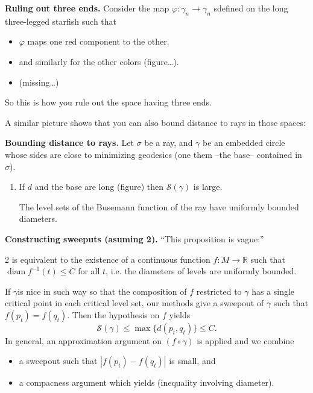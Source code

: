 \medskip\noindent
{\bf Ruling out three ends.}
Consider the map $\varphi:\gamma_n \to
\gamma_n$ sdefined on the long three-legged
starfish such that
\begin{itemize}
\item $\varphi$ maps one red component to
the other.
\item and similarly for the other colors
(figure…).
\item (missing…)
\end{itemize}

\noindent
So this is how you rule out the space having
three ends.

A similar picture shows that you can also
bound distance to rays in those spaces:

\medskip\noindent
{\bf Bounding distance to rays.}
Let $\sigma$ be a ray, and $\gamma$ be an
embedded circle whose sides are close to
minimizing geodesics (one them --the base--
contained in $\sigma$).

\begin{enumerate}
\item If $d$ and the base are long (figure)
then $\mathcal{S}(\gamma)$ is large.

The level sets of the Busemann function of
the ray have uniformly bounded diameters.
\end{enumerate}

\medskip\noindent
{\bf Constructing sweeputs (asuming 2).}
``This proposition is vague:''

\begin{proposition}
\label{proposition-2-equiv}
2 is equivalent to the existence of a
continuous function $f:M \to \mathbb{R}$
such that $\operatorname{diam}f^{-1}(t) \leq  C$ for all
$t$, i.e. the diameters of levels are
uniformly bounded.
\end{proposition}

\noindent
If $\gamma $is nice in such way so that the
composition of $f$ restricted to $\gamma$
has a single critical point in each critical
level set, our methods give a sweepout
of $\gamma$ such that $f(p_t)=f(q_t)$.
Then the hypothesis on $f$ yields
$$
\mathcal{S}(\gamma)\leq 
\operatorname{max} \{d(p_t,q_t)\}\leq C.
$$
In general, an approximation argument
on $(f \circ \gamma)$ is applied and we
combine
\begin{itemize}
\item a sweepout such that $|f(p_t)-f(q_t)|$
is small, and
\item a compacness argument which yields
(inequality involving diameter).
\end{itemize}


